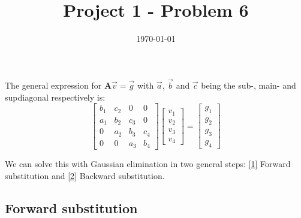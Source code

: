\documentclass[english,notitlepage]{article}  %
\begin{document}
\title{Project 1 - Problem 6}
\date{\today}

\maketitle

The general expression for $\boldsymbol{A}\vec{v} = \vec{g}$ with $\vec{a}$, $\vec{b}$ and $\vec{c}$ being the sub-, main- and supdiagonal respectively is:
\begin{equation}\label{eq:mat_Avg}
    \begin{bmatrix}
        b_1 & c_2 & 0 & 0 \\
        a_1 & b_2 & c_3 & 0 \\
        0 & a_2 & b_3 & c_4 \\
        0 & 0 & a_3 & b_4
    \end{bmatrix} \begin{bmatrix}
        v_1\\
        v_2\\
        v_3\\
        v_4
    \end{bmatrix} = \begin{bmatrix}
        g_1\\
        g_2\\
        g_3\\
        g_4
    \end{bmatrix}
\end{equation}

We can solve this with Gaussian elimination in two general steps: \hyperref[sec:forward]{[1]} Forward substitution and \hyperref[sec:backward]{[2]} Backward substitution.

\subsection*{Forward substitution}\label{sec:forward}
\end{document}
